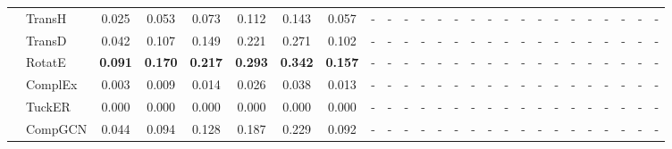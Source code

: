 \begin{table}[p]
{\begin{tabular}{l|l||cccccc||cccccc||cccccc||cccccc}
 & TransH & 0.025 & 0.053 & 0.073 & 0.112 & 0.143 & 0.057 & - & - & - & - & - & - & - & - & - & - & - & - & - & - & - & - & - & - \\
 & TransD & 0.042 & 0.107 & 0.149 & 0.221 & 0.271 & 0.102 & - & - & - & - & - & - & - & - & - & - & - & - & - & - & - & - & - & - \\
 & RotatE & \textbf{0.091} & \textbf{0.170} & \textbf{0.217} & \textbf{0.293} & \textbf{0.342} & \textbf{0.157} & - & - & - & - & - & - & - & - & - & - & - & - & - & - & - & - & - & - \\
 & ComplEx & 0.003 & 0.009 & 0.014 & 0.026 & 0.038 & 0.013 & - & - & - & - & - & - & - & - & - & - & - & - & - & - & - & - & - & - \\
 & TuckER & 0.000 & 0.000 & 0.000 & 0.000 & 0.000 & 0.000 & - & - & - & - & - & - & - & - & - & - & - & - & - & - & - & - & - & - \\
 & CompGCN & 0.044 & 0.094 & 0.128 & 0.187 & 0.229 & 0.092 & - & - & - & - & - & - & - & - & - & - & - & - & - & - & - & - & - & - \\
\hline
\end{tabular}%
}
\end{table}
